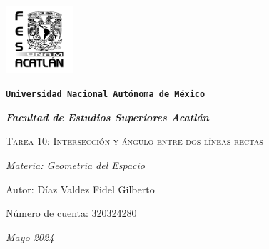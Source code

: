 \documentclass{article}
\begin{document}
\begin{titlepage}
    \centering   
    {\includegraphics[width=2.5cm]{logo.png}\par}
    {\texttt{\bfseries \LARGE Universidad Nacional Autónoma de México} \par}
    \vspace{1cm}
    {\itshape \Large \bfseries Facultad de Estudios Superiores Acatlán \par}
    \vspace{3cm}
    {\scshape \Huge Tarea 10: Intersección y ángulo entre dos líneas rectas\par}
    \vspace {3cm}
    {\slshape \Large Materia: Geometria del Espacio \par}
    \vspace{2cm}
    {\Large Autor: Díaz Valdez Fidel Gilberto\par}
    {\Large Número de cuenta: 320324280\par}
    \vfill
    {\itshape Mayo 2024 \par}
\end{titlepage}
\end{document}

